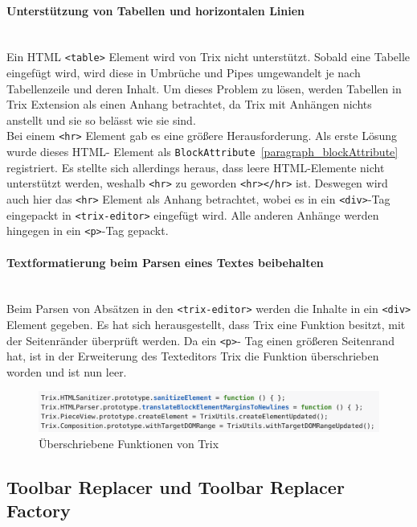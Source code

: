 \paragraph{Unterstützung von Tabellen und horizontalen Linien}
\mbox{}\\
Ein HTML \texttt{<table>} Element wird von Trix nicht unterstützt. Sobald eine Tabelle eingefügt wird, wird diese in 
Umbrüche und Pipes umgewandelt je nach Tabellenzeile und deren Inhalt. Um dieses Problem zu lösen, werden 
Tabellen in Trix Extension als einen Anhang betrachtet, da Trix mit Anhängen nichts anstellt und sie so belässt wie 
sie sind.\\
Bei einem \texttt{<hr>} Element gab es eine größere Herausforderung. Als erste Lösung wurde dieses HTML-
Element als \texttt{BlockAttribute}~\ref{paragraph_blockAttribute} registriert. Es stellte sich allerdings heraus, dass 
leere HTML-Elemente nicht unterstützt werden, weshalb \texttt{<hr>} zu geworden \texttt{<hr></hr>} ist. Deswegen 
wird auch hier das \texttt{<hr>} Element als Anhang betrachtet, wobei es in ein \texttt{<div>}-Tag eingepackt in 
\texttt{<trix-editor>} eingefügt wird. Alle anderen Anhänge werden hingegen in ein \texttt{<p>}-Tag gepackt.

\paragraph{Textformatierung beim Parsen eines Textes beibehalten}
\mbox{}\\
Beim Parsen von Absätzen in den \texttt{<trix-editor>} werden die Inhalte in ein \texttt{<div>} Element gegeben. Es 
hat sich herausgestellt, dass Trix eine Funktion besitzt, mit der Seitenränder überprüft werden. Da ein \texttt{<p>}-
Tag einen größeren Seitenrand hat, ist in der Erweiterung des Texteditors Trix die Funktion überschrieben worden 
und ist nun leer.

\begin{figure}[H]
\begin{center}
	\includegraphics[scale=.5]{images/workaround.png}
\end{center}
	\caption{Überschriebene Funktionen von Trix} 
\end{figure}

\subsection{Toolbar Replacer und Toolbar Replacer Factory}
\label{subsec_toolbar_replacer_factory}

